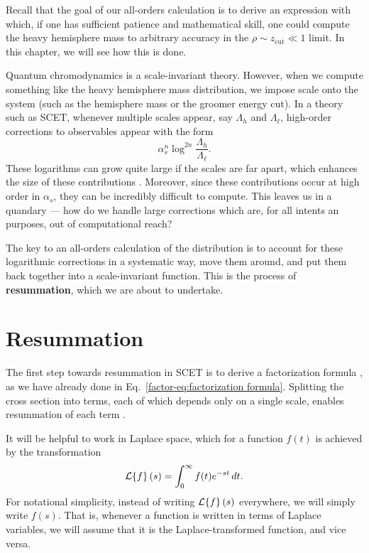 \documentclass[../thesis.tex]{subfiles}
\providecommand{\zcut}{z_\mathrm{{cut}}}
\providecommand{\cL}{\mathcal{L}}
\begin{document}
	Recall that the goal of our all-orders calculation is to derive an expression with which, if one has sufficient patience and mathematical skill, one could compute the heavy hemisphere mass to arbitrary accuracy in the $\rho \sim \zcut \ll 1$ limit. In this chapter, we will see how this is done.

	Quantum chromodynamics is a scale-invariant theory. However, when we compute something like the heavy hemisphere mass distribution, we impose scale onto the system (such as the hemisphere mass or the groomer energy cut). In a theory such as SCET, whenever multiple scales appear, say $\Lambda_h$ and $\Lambda_\ell$, high-order corrections to observables appear with the form \cite{becher_introduction_2015-1}
	\begin{equation}
		\alpha_s^n \log^{2n}\frac{\Lambda_h}{\Lambda_\ell}.
	\end{equation}
	These logarithms can grow quite large if the scales are far apart, which enhances the size of these contributions \cite{schwartz_quantum_2014}. Moreover, since these contributions occur at high order in $\alpha_s$, they can be incredibly difficult to compute. This leaves us in a quandary --- how do we handle large corrections which are, for all intents an purposes, out of computational reach?

	The key to an all-orders calculation of the distribution is to account for these logarithmic corrections in a systematic way, move them around, and put them back together into a scale-invariant function. This is the process of \textbf{resummation}, which we are about to undertake.

\section{Resummation}\label{all-sec:resummation}
	The first step towards resummation in SCET is to derive a factorization formula \cite{becher_introduction_2015-1}, as we have already done in Eq.~\ref{factor-eq:factorization formula}. Splitting the cross section into terms, each of which depends only on a single scale, enables resummation of each term \cite{frye_factorization_2016}.

	It will be helpful to work in Laplace space, which for a function $f(t)$ is achieved by the transformation \cite{boas_mathematical_2006}
	\begin{equation}
		\cL\qty{f}(s) = \int_0^\infty f(t) e^{-st}\,dt.
	\end{equation}
	For notational simplicity, instead of writing $\cL\qty{f}(s)$ everywhere, we will simply write $f(s)$. That is, whenever a function is written in terms of Laplace variables, we will assume that it is the Laplace-transformed function, and vice versa.
\end{document}
